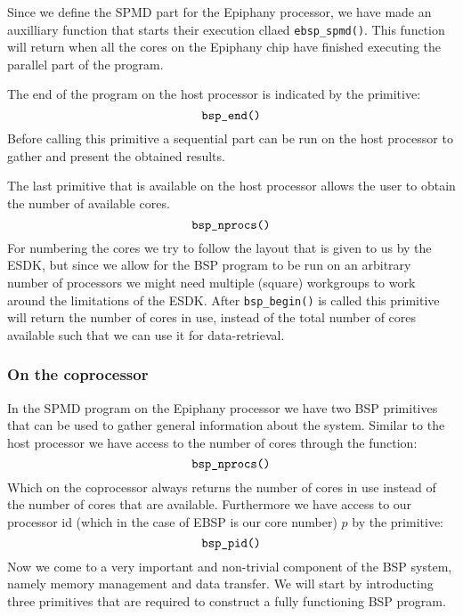\documentclass[fleqn]{article}
\renewcommand{\(}{\left(}
\renewcommand{\)}{\right)}
\begin{document}
Since we define the SPMD part for the Epiphany processor, we have made an auxilliary function that starts their execution cllaed \verb.ebsp_spmd().. This function will return when all the cores on the Epiphany chip have finished executing the parallel part of the program. 

The end of the program on the host processor is indicated by the primitive:
\begin{equation}
    \verb.bsp_end(). 
\end{equation}
Before calling this primitive a sequential part can be run on the host processor to gather and present the obtained results.

The last primitive that is available on the host processor allows the user to obtain the number of available cores. 
\begin{equation}
    \verb.bsp_nprocs(). 
\end{equation}
For numbering the cores we try to follow the layout that is given to us by the ESDK, but since we allow for the BSP program to be run on an arbitrary number of processors we might need multiple (square) workgroups to work around the limitations of the ESDK. After \verb.bsp_begin(). is called this primitive will return the number of cores in use, instead of the total number of cores available such that we can use it for data-retrieval.

\subsubsection{On the coprocessor}

In the SPMD program on the Epiphany processor we have two BSP primitives that can be used to gather general information about the system. Similar to the host processor we have access to the number of cores through the function:
\begin{equation}
    \verb.bsp_nprocs(). 
\end{equation}
Which on the coprocessor always returns the number of cores in use instead of the number of cores that are available. Furthermore we have access to our processor id (which in the case of EBSP is our core number) $p$ by the primitive:
\begin{equation}
    \verb.bsp_pid(). 
\end{equation}
Now we come to a very important and non-trivial component of the BSP system, namely memory management and data transfer. We will start by introducting three primitives that are required to construct a fully functioning BSP program.
\end{document}
